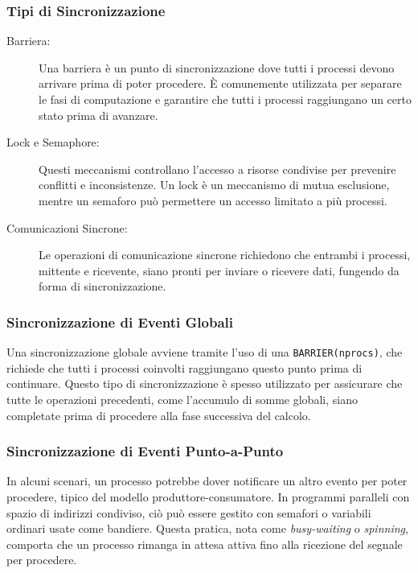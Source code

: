 \subsubsection{Tipi di Sincronizzazione}
\begin{description}
    \item[Barriera:] Una barriera è un punto di
    sincronizzazione dove tutti i processi devono
    arrivare prima di poter procedere. È comunemente
    utilizzata per separare le fasi di computazione e
    garantire che tutti i processi raggiungano un certo
    stato prima di avanzare.
    \item[Lock e Semaphore:] Questi meccanismi controllano
    l'accesso a risorse condivise per prevenire conflitti
    e inconsistenze. Un lock è un meccanismo di mutua
    esclusione, mentre un semaforo può permettere un
    accesso limitato a più processi.
    \item[Comunicazioni Sincrone:] Le operazioni di
    comunicazione sincrone richiedono che entrambi i 
    processi, mittente e ricevente, siano pronti per 
    inviare o ricevere dati, fungendo da forma di 
    sincronizzazione.
\end{description}

\subsubsection{Sincronizzazione di Eventi Globali}
Una sincronizzazione globale avviene tramite l'uso
di una \texttt{BARRIER(nprocs)}, che richiede che tutti 
i processi coinvolti raggiungano questo punto prima di
continuare. Questo tipo di sincronizzazione è spesso 
utilizzato per assicurare che tutte le operazioni 
precedenti, come l'accumulo di somme globali, siano 
completate prima di procedere alla fase successiva del 
calcolo.

\subsubsection{Sincronizzazione di Eventi Punto-a-Punto}
In alcuni scenari, un processo potrebbe dover notificare
un altro evento per poter procedere, tipico del modello
produttore-consumatore. In programmi paralleli con spazio
di indirizzi condiviso, ciò può essere gestito con
semafori o variabili ordinari usate come bandiere.
Questa pratica, nota come \textit{busy-waiting} o
\textit{spinning}, comporta che un processo rimanga
in attesa attiva fino alla ricezione del segnale per 
procedere.

